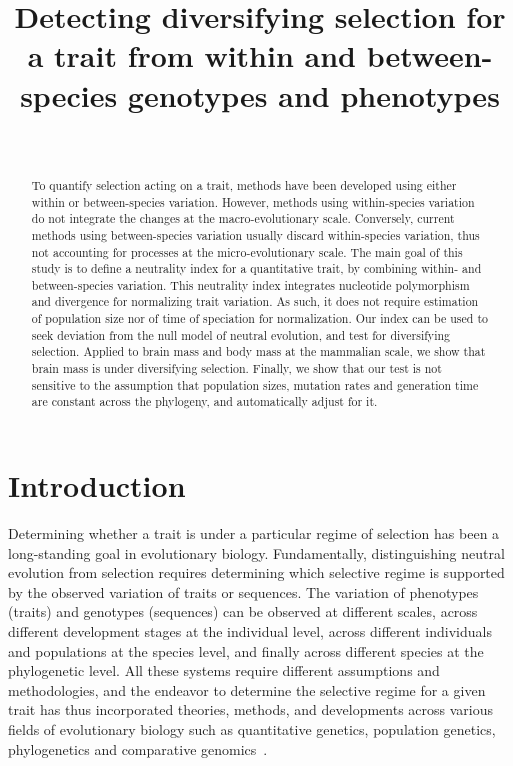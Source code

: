 \documentclass{article}
\title{Detecting diversifying selection for a trait from within and between-species genotypes and phenotypes}
\author{~}
\begin{document}
\maketitle

\begin{abstract}
    To quantify selection acting on a trait, methods have been developed using either within or between-species variation.
    However, methods using within-species variation do not integrate the changes at the macro-evolutionary scale.
    Conversely, current methods using between-species variation usually discard within-species variation, thus not accounting for processes at the micro-evolutionary scale.
    The main goal of this study is to define a neutrality index for a quantitative trait, by combining within- and between-species variation.
    This neutrality index integrates nucleotide polymorphism and divergence for normalizing trait variation.
    As such, it does not require estimation of population size nor of time of speciation for normalization.
    Our index can be used to seek deviation from the null model of neutral evolution, and test for diversifying selection.
    Applied to brain mass and body mass at the mammalian scale, we show that brain mass is under diversifying selection.
    Finally, we show that our test is not sensitive to the assumption that population sizes, mutation rates and generation time are constant across the phylogeny, and automatically adjust for it.
\end{abstract}


\section{Introduction}\label{sec:introduction}

Determining whether a trait is under a particular regime of selection has been a long-standing goal in evolutionary biology.
Fundamentally, distinguishing neutral evolution from selection requires determining which selective regime is supported by the observed variation of traits or sequences.
The variation of phenotypes (traits) and genotypes (sequences) can be observed at different scales, across different development stages at the individual level, across different individuals and populations at the species level, and finally across different species at the phylogenetic level.
All these systems require different assumptions and methodologies, and the endeavor to determine the selective regime for a given trait has thus incorporated theories, methods, and developments across various fields of evolutionary biology such as quantitative genetics, population genetics, phylogenetics and comparative genomics~\parencite{lynch_genetics_1998, walsh_evolution_2018}.
\end{document}

